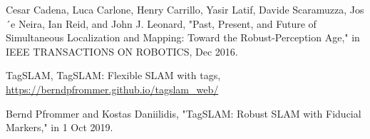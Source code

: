 \documentclass[a4j,fleqn,dvipdfmx,uplatex]{jsarticle}
\begin{document}
\begin{thebibliography}{99}
Cesar Cadena, Luca Carlone, Henry Carrillo, Yasir Latif, Davide Scaramuzza, Jos´e Neira, Ian Reid, and John J. Leonard, 
"Past, Present, and Future of Simultaneous Localization and Mapping: Toward the Robust-Perception Age,"
in IEEE TRANSACTIONS ON ROBOTICS, Dec 2016.\vspace{2mm}

TagSLAM, TagSLAM: Flexible SLAM with tags, \url{https://berndpfrommer.github.io/tagslam_web/}\vspace{2mm}

Bernd Pfrommer and Kostas Daniilidis, "TagSLAM: Robust SLAM with Fiducial Markers,"
in 1 Oct 2019.\vspace{2mm}



\end{thebibliography}
%
%
%
\end{document}
